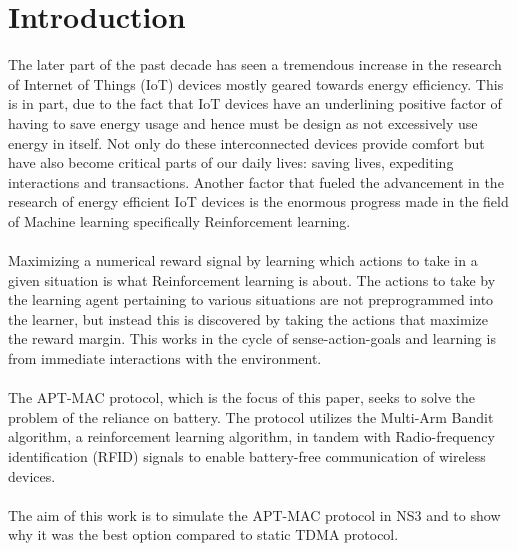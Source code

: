 \chapter{Introduction}

The later part of the past decade has seen a tremendous increase in the research of Internet of Things (IoT) devices mostly geared towards energy efficiency.
This is in part, due to the fact that IoT devices have an underlining positive factor of having to save energy usage and hence must be design as not excessively use energy in itself.
Not only do these interconnected devices provide comfort but have also become critical parts of our daily lives: saving lives, expediting interactions and transactions.
Another factor that fueled the advancement in the research of energy efficient IoT devices is the enormous progress made in the field of Machine learning specifically Reinforcement learning.\\\\
Maximizing a numerical reward signal by learning which actions to take in a given situation is what Reinforcement learning is about.
The actions to take by the learning agent pertaining to various situations are not preprogrammed into the learner, but instead this is discovered by taking the actions that maximize the reward margin\cite{Sutton&Barto}. This works in the cycle of sense-action-goals and learning is from immediate interactions with the environment.\\\\
The APT-MAC protocol, which is the focus of this paper, seeks to solve the problem of the reliance on battery.
The protocol utilizes the Multi-Arm Bandit algorithm, a reinforcement learning algorithm, in tandem with Radio-frequency identification (RFID) signals to enable battery-free communication of wireless devices\cite{Maselli}.\\\\
The aim of this work is to simulate the APT-MAC protocol in NS3 and to show why it was
the best option compared to static TDMA protocol.

